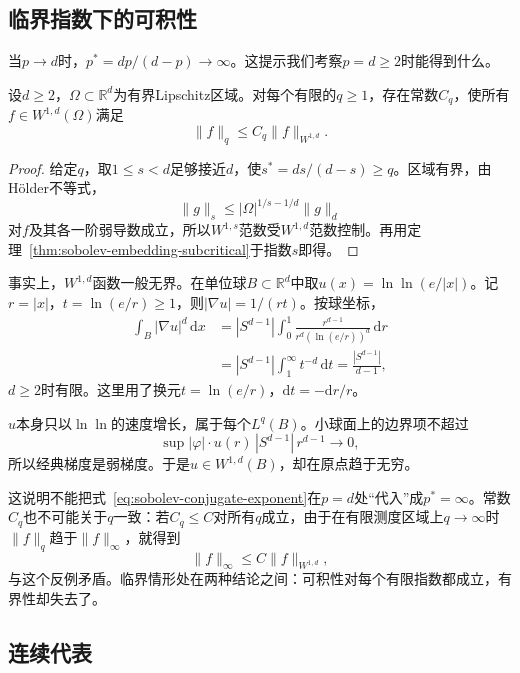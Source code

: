 \subsection{临界指数下的可积性}
\label{sec:sobolev-critical-integrability}

当$p\to d$时，$p^*=dp/(d-p)\to\infty$。这提示我们考察$p=d\geq2$时能得到什么。

\begin{theorem}[临界指数的嵌入]
\label{thm:sobolev-embedding-critical}
设$d\geq2$，$\Omega\subset\mathbb R^d$为有界Lipschitz区域。对每个有限的$q\geq1$，存在常数$C_q$，使所有$f\in W^{1,d}(\Omega)$满足
\begin{equation}
\lVert f\rVert_q\leq C_q\lVert f\rVert_{W^{1,d}} .
\label{eq:sobolev-embedding-critical}
\end{equation}
\end{theorem}

\begin{proof}
给定$q$，取$1\leq s<d$足够接近$d$，使$s^*=ds/(d-s)\geq q$。区域有界，由Hölder不等式，
\[
\lVert g\rVert_s\leq|\Omega|^{1/s-1/d}\lVert g\rVert_d
\]
对$f$及其各一阶弱导数成立，所以$W^{1,s}$范数受$W^{1,d}$范数控制。再用定理~\ref{thm:sobolev-embedding-subcritical}于指数$s$即得。
\end{proof}

事实上，$W^{1,d}$函数一般无界。在单位球$B\subset\mathbb R^d$中取$u(x)=\ln\ln(e/|x|)$。记$r=|x|$，$t=\ln(e/r)\geq1$，则$|\nabla u|=1/(rt)$。按球坐标，
\[
\begin{aligned}
\int_B|\nabla u|^d\,\mathrm dx
&=|S^{d-1}|\int_0^1\frac{r^{d-1}}{r^d(\ln(e/r))^d}\,\mathrm dr\\
&=|S^{d-1}|\int_1^\infty t^{-d}\,\mathrm dt=\frac{|S^{d-1}|}{d-1},
\end{aligned}
\]
$d\geq2$时有限。这里用了换元$t=\ln(e/r)$，$\mathrm dt=-\mathrm dr/r$。

$u$本身只以$\ln\ln$的速度增长，属于每个$L^q(B)$。小球面上的边界项不超过
\[
\sup|\varphi|\cdot u(r)\,|S^{d-1}|\,r^{d-1}\to0,
\]
所以经典梯度是弱梯度。于是$u\in W^{1,d}(B)$，却在原点趋于无穷。

这说明不能把式~\eqref{eq:sobolev-conjugate-exponent}在$p=d$处“代入”成$p^*=\infty$。常数$C_q$也不可能关于$q$一致：若$C_q\leq C$对所有$q$成立，由于在有限测度区域上$q\to\infty$时$\lVert f\rVert_q$趋于$\lVert f\rVert_\infty$，就得到
\[
\lVert f\rVert_\infty\leq C\lVert f\rVert_{W^{1,d}},
\]
与这个反例矛盾。临界情形处在两种结论之间：可积性对每个有限指数都成立，有界性却失去了。

\subsection{连续代表}
\label{sec:sobolev-continuous-representatives}

